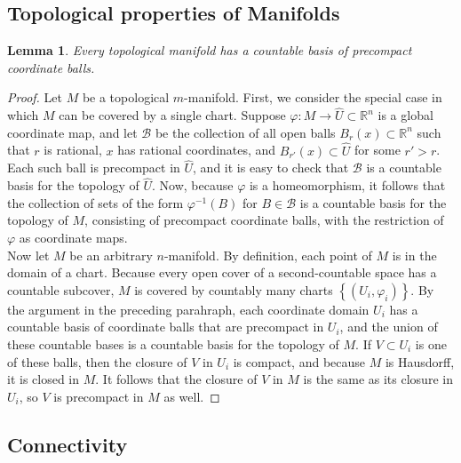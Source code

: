 \documentclass[reqno]{amsart}
\theoremstyle{plain}%
\newtheorem{lemma}[theorem]{Lemma}
\theoremstyle{definition}
\theoremstyle{remark}
\begin{document}
     \subsection*{Topological properties of Manifolds}
     \begin{lemma}\label{precompact-ball-basis}
         Every topological manifold has a countable basis of precompact coordinate
         balls.
     \end{lemma}
     \begin{proof}
        Let $M$ be a topological $m$-manifold. First, we consider the special case
        in which $M$ can be covered by a single chart. Suppose
        $\varphi  \colon M \to \hat{U} \subset \mathbb{R}^{n}$ is a global
        coordinate map, and let $\mathcal{B}$ be the collection of all open balls
        $B_r (x) \subset \mathbb{R}^{n}$ such that
        $r$ is rational, $x$ has rational coordinates, and
        $B_{r'}(x) \subset \hat{U}$ for some $r' > r$. Each such ball is
        precompact in $\hat{U}$, and it is easy to check that $\mathcal{B}$ is
        a countable basis for the topology of $\hat{U}$. Now, because $\varphi$ is
        a homeomorphism, it follows that the collection of sets
        of the form $\varphi^{-1}(B)$ for $B \in \mathcal{B}$ is a countable basis
        for the topology of $M$, consisting of precompact coordinate balls, with
        the restriction of $\varphi$ as coordinate maps.\\
        \linebreak
        Now let $M$ be an arbitrary $n$-manifold. By definition, each point of
        $M$ is in the domain of a chart. Because every open cover of
        a second-countable space has a countable subcover, $M$ is covered by
        countably many charts $\left\{ \left( U_i, \varphi_i \right)  \right\} $.
        By the argument in the preceding parahraph, each coordinate domain
        $U_i$ has a countable basis of coordinate balls that are precompact in
        $U_i$, and the union of these countable bases is a countable basis for the
        topology of $M$. If $V \subset U_i$ is one of these balls,
        then the closure of $V$ in $U_i$ is compact, and because
        $M$ is Hausdorff, it is closed in $M$. It follows that the closure of $V$ 
        in
        $M$ is the same as its closure in $U_i$, so $V$ is precompact in $M$ as
        well.
    \end{proof} 

    \subsection*{Connectivity}
\end{document}
